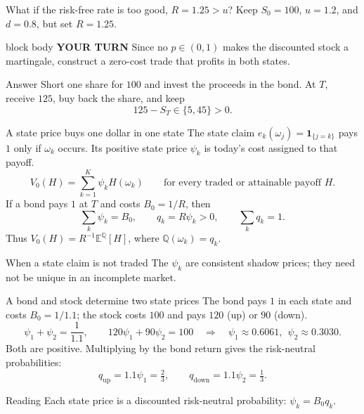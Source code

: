 \documentclass[handout,10pt,aspectratio=169]{beamer}
\newenvironment{pausebox}{\begin{beamercolorbox}[rounded=true,sep=0.8em,wd=\textwidth]{block body}
  \textbf{\color{CourseGold}YOUR TURN}\quad}{\end{beamercolorbox}}
\newcommand{\E}{\mathbb E}
\newcommand{\Q}{\mathbb Q}
\newcommand{\1}{\mathbf 1}
\begin{document}
\begin{frame}{What if the risk-free rate is too good, \(R=1.25>u\)?}
Keep \(S_0=100\), \(u=1.2\), and \(d=0.8\), but set \(R=1.25\).
\begin{pausebox}
Since no \(p\in(0,1)\) makes the discounted stock a martingale,
construct a zero-cost trade that profits in both states.
\end{pausebox}

\begin{exampleblock}{Answer}
Short one share for \(100\) and invest the proceeds in the bond.
At \(T\), receive \(125\), buy back the share, and keep
\[\boxed{125-S_T\in\{5,45\}>0.}\]
\end{exampleblock}
\end{frame}



\begin{frame}{A state price buys one dollar in one state}
The state claim \(e_k(\omega_j)=\1_{\{j=k\}}\) pays \(1\) only if
\(\omega_k\) occurs. Its positive state price \(\psi_k\) is today's cost
assigned to that payoff.
\[
\boxed{V_0(H)=\sum_{k=1}^K\psi_k H(\omega_k)}
\qquad\text{for every traded or attainable payoff }H.
\]
If a bond pays \(1\) at \(T\) and costs \(B_0=1/R\), then
\[
\sum_k\psi_k=B_0,\qquad q_k=R\psi_k>0,\qquad
\sum_k q_k=1.
\]
Thus \(V_0(H)=R^{-1}\E^\Q[H]\), where \(\Q(\omega_k)=q_k\).
\begin{block}{When a state claim is not traded}
The \(\psi_k\) are consistent shadow prices; they need not be unique in an
incomplete market.
\end{block}
\end{frame}

\begin{frame}{A bond and stock determine two state prices}
The bond pays \(1\) in each state and costs \(B_0=1/1.1\); the stock costs
\(100\) and pays \(120\) (up) or \(90\) (down).
\[
\psi_1+\psi_2=\frac1{1.1},
\qquad
120\psi_1+90\psi_2=100
\quad\Longrightarrow\quad
\boxed{\psi_1\approx0.6061,\ \ \psi_2\approx0.3030.}
\]
Both are positive. Multiplying by the bond return gives the risk-neutral
probabilities:
\[
q_{\mathrm{up}}=1.1\psi_1=\tfrac23,
\qquad q_{\mathrm{down}}=1.1\psi_2=\tfrac13.
\]
\begin{block}{Reading}
Each state price is a discounted risk-neutral probability:
\(\psi_k=B_0q_k\).
\end{block}
\end{frame}
\end{document}
